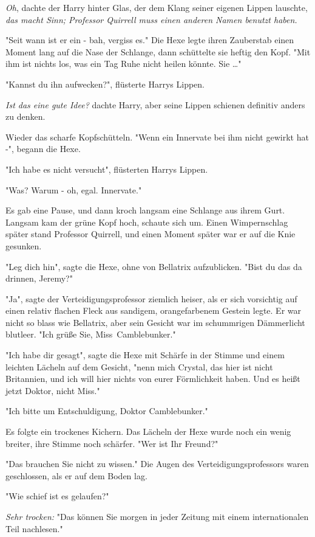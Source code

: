 {\emph{Oh}, dachte der Harry hinter Glas, der dem Klang seiner eigenen Lippen lauschte, \emph{das macht Sinn; Professor Quirrell muss einen anderen Namen benutzt haben.}

"Seit wann ist er ein - bah, vergiss es." Die Hexe legte ihren Zauberstab einen Moment lang auf die Nase der Schlange, dann schüttelte sie heftig den Kopf. "Mit ihm ist nichts los, was ein Tag Ruhe nicht heilen könnte. Sie …"

"Kannst du ihn aufwecken?", flüsterte Harrys Lippen.

\emph{Ist das eine gute Idee?} dachte Harry, aber seine Lippen schienen definitiv anders zu denken.

Wieder das scharfe Kopfschütteln. "Wenn ein Innervate bei ihm nicht gewirkt hat -", begann die Hexe.

"Ich habe es nicht versucht", flüsterten Harrys Lippen.

"Was? Warum - oh, egal. Innervate."

Es gab eine Pause, und dann kroch langsam eine Schlange aus ihrem Gurt. Langsam kam der grüne Kopf hoch, schaute sich um. Einen Wimpernschlag später stand Professor Quirrell, und einen Moment später war er auf die Knie gesunken.

"Leg dich hin", sagte die Hexe, ohne von Bellatrix aufzublicken. "Bist du das da drinnen, Jeremy?"

"Ja", sagte der Verteidigungsprofessor ziemlich heiser, als er sich vorsichtig auf einen relativ flachen Fleck aus sandigem, orangefarbenem Gestein legte. Er war nicht so blass wie Bellatrix, aber sein Gesicht war im schummrigen Dämmerlicht blutleer. "Ich grüße Sie, Miss~Camblebunker."

"Ich habe dir gesagt", sagte die Hexe mit Schärfe in der Stimme und einem leichten Lächeln auf dem Gesicht, "nenn mich Crystal, das hier ist nicht Britannien, und ich will hier nichts von eurer Förmlichkeit haben. Und es heißt jetzt Doktor, nicht Miss."

"Ich bitte um Entschuldigung, Doktor Camblebunker."

Es folgte ein trockenes Kichern. Das Lächeln der Hexe wurde noch ein wenig breiter, ihre Stimme noch schärfer. "Wer ist Ihr Freund?"

"Das brauchen Sie nicht zu wissen." Die Augen des Verteidigungsprofessors waren geschlossen, als er auf dem Boden lag.

"Wie schief ist es gelaufen?"

\emph{Sehr trocken:} "Das können Sie morgen in jeder Zeitung mit einem internationalen Teil nachlesen."

}
